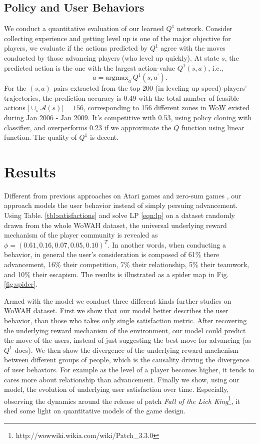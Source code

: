 \documentclass{sigchi}
\begin{document}
\subsection{Policy and User Behaviors}

We conduct a quantitative evaluation of our learned $Q^1$ network. Consider collecting experience and getting level up is one of the major objective for players, we evaluate if the actions predicted by $Q^1$ agree with the moves conducted by those advancing players (who level up quickly). At state $s$, the predicted action is the one with the largest action-value $Q^1(s,a)$, i.e.,
\begin{equation*}
a = \text{argmax}_{a^\prime}Q^1(s,a^\prime).
\end{equation*}
For the $(s,a)$ pairs extracted from the top 200 (in leveling up speed) players' trajectories, the prediction accuracy is 0.49 with the total number of feasible actions $|\cup_s\mathcal{A}(s)|=156$, corresponding to 156 different zones in WoW existed during Jan 2006 - Jan 2009. It's competitive with 0.53, using policy cloning \cite{amit2002parametric,sammut1992learning} with classifier, and overperforms 0.23 if we approximate the $Q$ function using linear function. The quality of $Q^1$ is decent.

\section{Results}

Different from previous approaches on Atari games \cite{mnih2015human} and zero-sum games \cite{silver2016mastering,heinrich2016deep}, our approach models the user behavior instead of simply persuing advancement. Using Table. \ref{tbl:satisfactions} and solve LP \eqref{eqn:lp} on a dataset randomly drawn from the whole WoWAH dataset, the universal underlying reward mechanism of the player community is revealed as $\phi=(0.61, 0.16, 0.07, 0.05, 0.10)^T$. In another words, when conducting a behavior, in general the user's consideration is composed of 61\% there advancement, 16\% their competition, 7\% their relationship, 5\% their teamwork, and 10\% their escapism. The results is illustrated as a spider map in Fig. \ref{fig:spider}.

Armed with the model we conduct three different kinds further studies on WoWAH dataset. First we show that our model better describes the user behavior, than those who takes only single satisfaction metric. After recovering the underlying reward mechanism of the environment, our model could predict the move of the users, instead of just suggesting the best move for advancing (as $Q^1$ does). We then show the divergence of the underlying reward machenism between different groups of people, which is the causality driving the divergence of user behaviors. For example as the level of a player becomes higher, it tends to cares more about relationship than advancement. Finally we show, using our model, the evolution of underlying user satisfaction over time. Especially, observing the dynamics around the release of patch \textit{Fall of the Lich King}\footnote{http://wowwiki.wikia.com/wiki/Patch\_3.3.0}, it shed some light on quantitative models of the game design.
\end{document}
